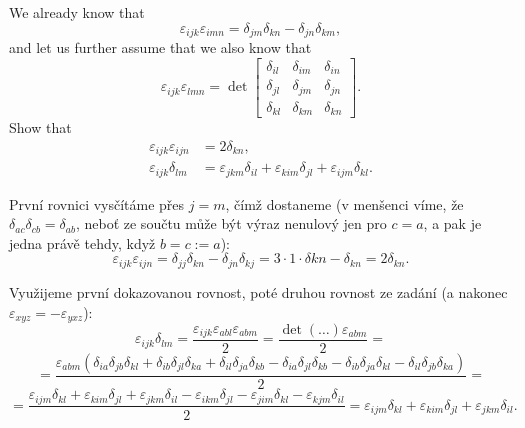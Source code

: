 \documentclass[12pt]{article}					%
\begin{document}
\begin{priklad}[1.]
	We already know that
	$$ ε_{ijk} ε_{imn} = δ_{jm}δ_{kn} - δ_{jn}δ_{km}, $$
	and let us further assume that we also know that
	$$ ε_{ijk}ε_{lmn} = \det \begin{bmatrix}δ_{il} & δ_{im} & δ_{in}\\ δ_{jl} & δ_{jm} & δ_{jn}\\ δ_{kl} & δ_{km} & δ_{kn}\end{bmatrix}. $$
	Show that
	\begin{align*}
		ε_{ijk} ε_{ijn} &= 2δ_{kn},\\
		ε_{ijk} δ_{lm} &= ε_{jkm} δ_{il} + ε_{kim}δ_{jl} + ε_{ijm}δ_{kl}.
	\end{align*}

	\begin{dukazin}
		První rovnici vysčítáme přes $j = m$, čímž dostaneme (v menšenci víme, že $δ_{ac}δ_{cb} = δ_{ab}$, neboť ze součtu může být výraz nenulový jen pro $c = a$, a pak je jedna právě tehdy, když $b = c := a$):
		$$ ε_{ijk} ε_{ijn} = δ_{jj}δ_{kn} - δ_{jn}δ_{kj} = 3·1·δ{kn} - δ_{kn} = 2δ_{kn}. $$

		Využijeme první dokazovanou rovnost, poté druhou rovnost ze zadání (a nakonec $ε_{xyz} = -ε_{yxz}$):
		$$ ε_{ijk}δ_{lm} = \frac{ε_{ijk}ε_{abl}ε_{abm}}{2} = \frac{\det(…)ε_{abm}}{2} = $$
		$$ = \frac{ε_{abm}(δ_{ia}δ_{jb}δ_{kl} + δ_{ib}δ_{jl}δ_{ka} + δ_{il}δ_{ja}δ_{kb} - δ_{ia}δ_{jl}δ_{kb} - δ_{ib}δ_{ja}δ_{kl} - δ_{il}δ_{jb}δ_{ka})}{2} = $$
		$$ = \frac{ε_{ijm}δ_{kl} + ε_{kim}δ_{jl} + ε_{jkm}δ_{il} - ε_{ikm}δ_{jl} - ε_{jim}δ_{kl} - ε_{kjm}δ_{il}}{2} = ε_{ijm} δ_{kl} + ε_{kim}δ_{jl} + ε_{jkm}δ_{il}. $$
	\end{dukazin}
\end{priklad}
\end{document}
